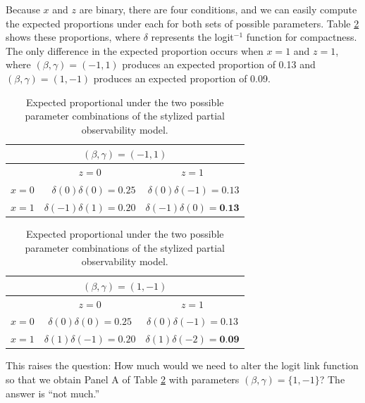 \documentclass[10pt]{article}
\begin{document}
Because $x$ and $z$ are binary, there are four conditions, and we can easily compute the expected proportions under each for both sets of possible parameters. 
Table \ref{tab:ep} shows these proportions, where $\delta$ represents the logit$^{-1}$ function for compactness. 
The only difference in the expected proportion occurs when $x = 1$ and $z = 1$, where $(\beta, \gamma) = (-1, 1)$ produces an expected proportion of 0.13 and $(\beta, \gamma) = (1, -1)$ produces an expected proportion of 0.09.

\begin{table}[h]
    \begin{subtable}{.5\linewidth}
      \centering
        \caption{}
\begin{tabular}{crr}
\multicolumn{3}{c}{$(\beta, \gamma) = (-1, 1)$}\\ \hline
 & \multicolumn{1}{c}{$z = 0$} & \multicolumn{1}{c}{$z = 1$}\\
$x = 0$ & $\delta(0)\delta(0) = 0.25$ & $\delta(0)\delta(-1) = 0.13$\\
$x = 1$ & $\delta(-1)\delta(1) = 0.20$ & $\delta(-1)\delta(0) = \textbf{0.13}$\\\hline
\end{tabular}
    \end{subtable}%
    \begin{subtable}{.5\linewidth}
      \centering
        \caption{}
\begin{tabular}{ccc}
\multicolumn{3}{c}{$(\beta, \gamma) = (1, -1)$}\\ \hline
 & \multicolumn{1}{c}{$z = 0$} & \multicolumn{1}{c}{$z = 1$}\\
$x = 0$ & $\delta(0)\delta(0) = 0.25$ & $\delta(0)\delta(-1) = 0.13$\\
$x = 1$ & $\delta(1)\delta(-1) = 0.20$ & $\delta(1)\delta(-2) = \textbf{0.09}$\\\hline
\end{tabular}
    \end{subtable} 
        \caption{Expected proportional under the two possible parameter combinations of the stylized partial observability model.}\label{tab:ep}
\end{table}

This raises the question: How much would we need to alter the logit link function so that we obtain Panel A of Table \ref{tab:ep} with parameters $(\beta, \gamma) = \{1, -1\}$? The answer is ``not much.''
\end{document}
